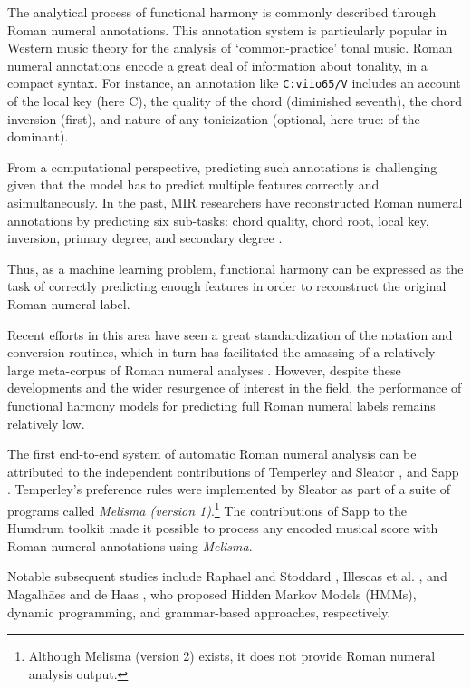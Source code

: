 
The analytical process of functional harmony is commonly
described through Roman numeral annotations. This annotation
system is particularly popular in Western music theory for
the analysis of `common-practice' tonal music. Roman numeral
annotations encode a great deal of information about
tonality, in a compact syntax. For instance, an annotation
like  \texttt{C:viio65/V} includes an account of the local
key (here C), the quality of the chord (diminished seventh),
the chord inversion (first), and nature of any tonicization
(optional, here true: of the dominant).

From a computational perspective, predicting such
annotations is challenging given that the model has to
predict multiple features correctly and asimultaneously. In
the past, MIR researchers have reconstructed Roman numeral
annotations by predicting six sub-tasks: chord quality,
chord root, local key, inversion, primary degree, and
secondary degree \cite{chen2018functional, micchi2020not}.

Thus, as a machine learning problem, functional harmony can
be expressed as the task of correctly predicting enough
features in order to reconstruct the original Roman numeral
label.

Recent efforts in this area have seen a great
standardization of the notation and conversion routines,
\cite{gotham2019romantext} which in turn has facilitated the
amassing of a relatively large meta-corpus of Roman numeral
analyses \cite{gotham2019romantext}. However, despite these
developments and the wider resurgence of interest in the
field, the performance of functional harmony models for
predicting full Roman numeral labels remains relatively low.


The first end-to-end system of automatic Roman numeral
analysis can be attributed to the independent contributions
of Temperley and Sleator \cite{temperley2004cognition}, and
Sapp \cite{sapp2009tsroot}. Temperley's preference rules
were implemented by Sleator as part of a suite of programs
called \emph{Melisma (version 1)}.\footnote{Although Melisma
(version 2) exists, it does not provide Roman numeral
analysis output.} The contributions of Sapp to the Humdrum
toolkit \cite{huron2002music} made it possible to process
any encoded musical score with Roman numeral annotations
using \emph{Melisma}.

Notable subsequent studies include Raphael and Stoddard
\cite{raphael2004functional}, Illescas et al.
\cite{illescas2007harmonic}, and Magalh\=aes and de Haas
\cite{magalhaes2011functional}, who proposed Hidden Markov
Models (HMMs), dynamic programming, and grammar-based
approaches, respectively.

